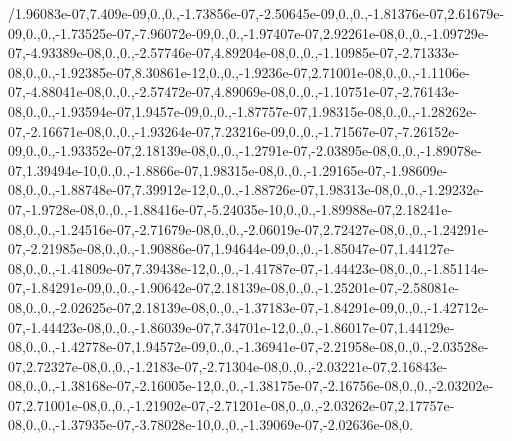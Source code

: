 {/1.\-96083e-\/07,7.\-409e-\/09,0.,0.,-\/1.\-73856e-\/07,-\/2.\-50645e-\/09,0.,0.,-\/1.\-81376e-\/07,2.\-61679e-\/09,0.,0.,-\/1.\-73525e-\/07,-\/7.\-96072e-\/09,0.,0.,-\/1.\-97407e-\/07,2.\-92261e-\/08,0.,0.,-\/1.\-09729e-\/07,-\/4.\-93389e-\/08,0.,0.,-\/2.\-57746e-\/07,4.\-89204e-\/08,0.,0.,-\/1.\-10985e-\/07,-\/2.\-71333e-\/08,0.,0.,-\/1.\-92385e-\/07,8.\-30861e-\/12,0.,0.,-\/1.\-9236e-\/07,2.\-71001e-\/08,0.,0.,-\/1.\-1106e-\/07,-\/4.\-88041e-\/08,0.,0.,-\/2.\-57472e-\/07,4.\-89069e-\/08,0.,0.,-\/1.\-10751e-\/07,-\/2.\-76143e-\/08,0.,0.,-\/1.\-93594e-\/07,1.\-9457e-\/09,0.,0.,-\/1.\-87757e-\/07,1.\-98315e-\/08,0.,0.,-\/1.\-28262e-\/07,-\/2.\-16671e-\/08,0.,0.,-\/1.\-93264e-\/07,7.\-23216e-\/09,0.,0.,-\/1.\-71567e-\/07,-\/7.\-26152e-\/09,0.,0.,-\/1.\-93352e-\/07,2.\-18139e-\/08,0.,0.,-\/1.\-2791e-\/07,-\/2.\-03895e-\/08,0.,0.,-\/1.\-89078e-\/07,1.\-39494e-\/10,0.,0.,-\/1.\-8866e-\/07,1.\-98315e-\/08,0.,0.,-\/1.\-29165e-\/07,-\/1.\-98609e-\/08,0.,0.,-\/1.\-88748e-\/07,7.\-39912e-\/12,0.,0.,-\/1.\-88726e-\/07,1.\-98313e-\/08,0.,0.,-\/1.\-29232e-\/07,-\/1.\-9728e-\/08,0.,0.,-\/1.\-88416e-\/07,-\/5.\-24035e-\/10,0.,0.,-\/1.\-89988e-\/07,2.\-18241e-\/08,0.,0.,-\/1.\-24516e-\/07,-\/2.\-71679e-\/08,0.,0.,-\/2.\-06019e-\/07,2.\-72427e-\/08,0.,0.,-\/1.\-24291e-\/07,-\/2.\-21985e-\/08,0.,0.,-\/1.\-90886e-\/07,1.\-94644e-\/09,0.,0.,-\/1.\-85047e-\/07,1.\-44127e-\/08,0.,0.,-\/1.\-41809e-\/07,7.\-39438e-\/12,0.,0.,-\/1.\-41787e-\/07,-\/1.\-44423e-\/08,0.,0.,-\/1.\-85114e-\/07,-\/1.\-84291e-\/09,0.,0.,-\/1.\-90642e-\/07,2.\-18139e-\/08,0.,0.,-\/1.\-25201e-\/07,-\/2.\-58081e-\/08,0.,0.,-\/2.\-02625e-\/07,2.\-18139e-\/08,0.,0.,-\/1.\-37183e-\/07,-\/1.\-84291e-\/09,0.,0.,-\/1.\-42712e-\/07,-\/1.\-44423e-\/08,0.,0.,-\/1.\-86039e-\/07,7.\-34701e-\/12,0.,0.,-\/1.\-86017e-\/07,1.\-44129e-\/08,0.,0.,-\/1.\-42778e-\/07,1.\-94572e-\/09,0.,0.,-\/1.\-36941e-\/07,-\/2.\-21958e-\/08,0.,0.,-\/2.\-03528e-\/07,2.\-72327e-\/08,0.,0.,-\/1.\-2183e-\/07,-\/2.\-71304e-\/08,0.,0.,-\/2.\-03221e-\/07,2.\-16843e-\/08,0.,0.,-\/1.\-38168e-\/07,-\/2.\-16005e-\/12,0.,0.,-\/1.\-38175e-\/07,-\/2.\-16756e-\/08,0.,0.,-\/2.\-03202e-\/07,2.\-71001e-\/08,0.,0.,-\/1.\-21902e-\/07,-\/2.\-71201e-\/08,0.,0.,-\/2.\-03262e-\/07,2.\-17757e-\/08,0.,0.,-\/1.\-37935e-\/07,-\/3.\-78028e-\/10,0.,0.,-\/1.\-39069e-\/07,-\/2.\-02636e-\/08,0.}
